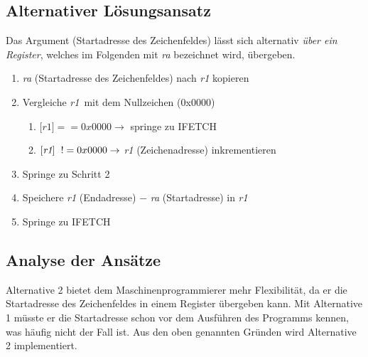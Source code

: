 \documentclass[12pt,a4paper]{article}
\begin{document}
\subsection{Alternativer Lösungsansatz}
Das Argument (Startadresse des Zeichenfeldes) lässt sich alternativ \emph{über ein Register}, welches im Folgenden mit \textit{ra} bezeichnet wird, übergeben. 
\begin{enumerate}
\item \textit{ra} (Startadresse des Zeichenfeldes) nach \textit{r1} kopieren
\item Vergleiche \lbrack \textit{r1}\rbrack \ mit dem Nullzeichen (0x0000)
\begin{enumerate}
\item \(\lbrack \textit{r1}\rbrack == 0x0000 \rightarrow \) springe zu IFETCH
\item \(\lbrack \textit{r1}\rbrack \hspace{6 pt} != 0x0000 \rightarrow \) \textit{r1} (Zeichenadresse) inkrementieren
\end{enumerate}
\item Springe zu Schritt 2
\item Speichere \textit{r1} (Endadresse) \(-\) \textit{ra} (Startadresse) in \textit{r1}
\item Springe zu IFETCH
\end {enumerate}
\subsection{Analyse der Ansätze}
Alternative 2 bietet dem Maschinenprogrammierer mehr Flexibilität, da er die Startadresse des Zeichenfeldes in einem Register übergeben kann. Mit Alternative 1 müsste er die Startadresse schon vor dem Ausführen des Programms kennen, was häufig nicht der Fall ist.\newline \newline
Aus den oben genannten Gründen wird Alternative 2 implementiert. 
\end{document}
